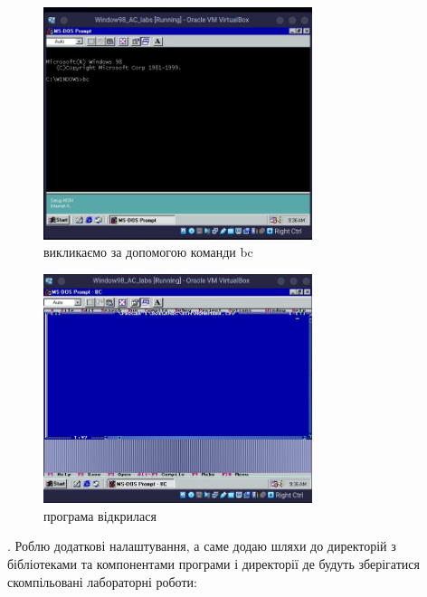 \begin{figure}[h]
    \centering
    \includegraphics[width=0.7\textwidth]{reports/AC/lab1/assets/31.jpeg}
    \caption{викликаємо за допомогою команди bc}
\end{figure}

\begin{figure}[h]
    \centering
    \includegraphics[width=0.7\textwidth]{reports/AC/lab1/assets/32.jpeg}
    \caption{програма відкрилася}
\end{figure}

. Роблю додаткові налаштування, а саме додаю шляхи до директорій з бібліотеками та компонентами програми і директорії де будуть зберігатися скомпільовані лабораторні роботи:

